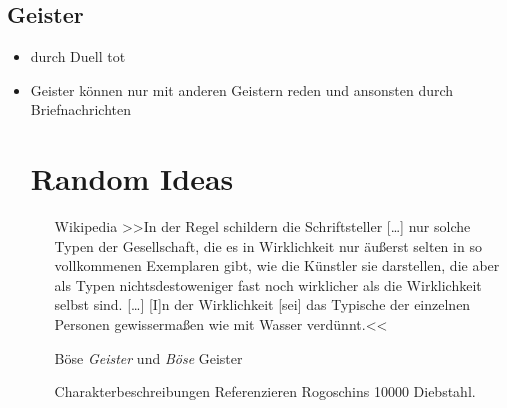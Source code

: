 \documentclass[12pt, a4paper, openany]{report}
\begin{document}
\section{Geister}
\begin{itemize} 
\item durch Duell tot 
\item Geister können nur mit anderen Geistern reden und ansonsten durch Briefnachrichten 

\chapter{Random Ideas} 

\begin{itemize}
  \item[Wikipedia] >>In der Regel schildern die Schriftsteller […] nur solche Typen der
    Gesellschaft, die es in Wirklichkeit nur äußerst selten in so vollkommenen
    Exemplaren gibt, wie die Künstler sie darstellen, die aber als Typen
    nichtsdestoweniger fast noch wirklicher als die Wirklichkeit selbst sind.
    […] [I]n der Wirklichkeit [sei] das Typische der einzelnen Personen
    gewissermaßen wie mit Wasser verdünnt.<<
  \item[] Böse \emph{Geister} und \emph{Böse} Geister
  \item[] Charakterbeschreibungen Referenzieren Rogoschins 10000 Diebstahl. 
\end{itemize}

\end{itemize}
\end{document}
